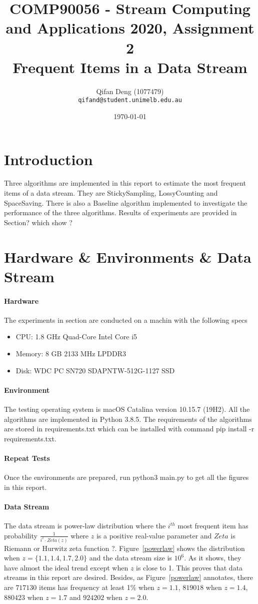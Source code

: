 \documentclass[10pt]{article}
\title{COMP90056 - Stream Computing and Applications 2020, Assignment 2 
\\Frequent Items in a Data Stream}
\author{
  Qifan Deng (1077479)\\
  \texttt{qifand@student.unimelb.edu.au} }
\date{\printdayoff\normalsize\today}
\begin{document}
\sloppy
\maketitle

\section{Introduction}
Three algorithms are implemented in this report to estimate the most frequent items of a data stream.
They are StickySampling, LossyCounting and SpaceSaving. 
There is also a Baseline algorithm implemented to investigate the performance of the three algorithms.
Results of experiments are provided in Section? which show ? 

\section{Hardware \& Environments \& Data Stream}

\paragraph{Hardware}
The experiments in section are conducted on a machin with the following specs
\begin{itemize}
     \setlength\itemsep{1pt}
       \item CPU: 1.8 GHz Quad-Core Intel Core i5
       \item Memory: 8 GB 2133 MHz LPDDR3
       \item Disk: WDC PC SN720 SDAPNTW-512G-1127 SSD
\end{itemize}
\paragraph{Environment}
The testing operating system is macOS Catalina version 10.15.7 (19H2).
All the algorithms are implemented in Python 3.8.5.
The requirements of the algorithms are stored in requirements.txt which can be installed with command pip install -r requirements.txt.

\paragraph{Repeat Tests}
Once the environments are prepared, run python3 main.py to get all the figures in this report.

\paragraph{Data Stream}
The data stream is power-law distribution where 
the $i^{th}$ most frequent item has probability $\frac{1}{i^{z} \cdot{} Zeta(z)}$
where $z$ is a positive real-value parameter and $Zeta$ is Riemann or Hurwitz zeta function ?. 
Figure~\ref{powerlaw} shows the distribution when $z = \{1.1, 1.4, 1.7, 2.0\}$ and the data stream size is $10^6$.
As it shows, they have almost the ideal trend except when $z$ is close to 1. 
This proves that data streams in this report are desired.
Besides, as Figure~\ref{powerlaw} annotates, there are $717130$ items has frequency at least 1\% when $z=1.1$,  
$819018$ when  $z=1.4$, $880423$ when $z=1.7$ and $924202$ when $z=2.0$.
\end{document}
